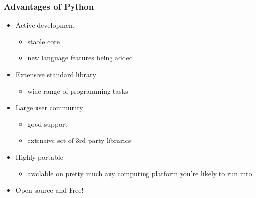\documentclass{beamer}
\begin{document}
\begin{frame}
  \frametitle{Advantages of Python}
\begin{itemize}

\item Active development
\begin{itemize}
	\item stable core
	\item new language features being added
\end{itemize}


\item Extensive standard library
\begin{itemize}	
	\item wide range of programming tasks
\end{itemize}

\item Large user community
\begin{itemize}
	\item good support
	\item extensive set of 3rd party libraries
\end{itemize}

\item Highly portable
\begin{itemize}
	\item available on pretty much any computing platform you're likely to run into
\end{itemize}

\item Open-source and Free!
\end{itemize}

\end{frame}
\end{document}
